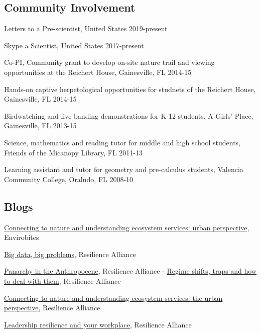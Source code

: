 \documentclass[11pt,]{article}
\providecommand{\tightlist}{%
  \setlength{\itemsep}{0pt}\setlength{\parskip}{0pt}}
\renewenvironment{itemize}{
 \begin{list}{- }{
   \setlength{\leftmargin}{1.5em}
   \setlength{\itemsep}{0pt}
 }
}{
 \end{list}
}
\begin{document}
\hypertarget{community-involvement}{%
\subsection{Community Involvement}\label{community-involvement}}

\begin{itemize}
\tightlist
\item
  Letters to a Pre-scientist, United States \hfill 2019-present
\item
  Skype a Scientist, United States \hfill 2017-present
\item
  Co-PI, Community grant to develop on-site nature trail and viewing
  opportunities at the Reichert House, Gainesville, FL \hfill 2014-15
\item
  Hands-on captive herpetological opportunities for studnets of the
  Reichert House, Gainesville, FL \hfill 2014-15
\item
  Birdwatching and live banding demonstrations for K-12 students, A
  Girls' Place, Gainesville, FL \hfill 2013-15
\item
  Science, mathematics and reading tutor for middle and high school
  students, Friends of the Micanopy Library, FL \hfill 2011-13
\item
  Learning assistant and tutor for geometry and pre-calculus students,
  Valencia Community College, Oralndo, FL \hfill 2008-10
\end{itemize}

\hypertarget{blogs}{%
\subsection{Blogs}\label{blogs}}

\begin{itemize}
\tightlist
\item
  \href{https://envirobites.org/2017/10/17/connecting-to-nature-and-understanding-ecosystem-services-the-urban-perspective/}{Connecting
  to nature and understanding ecosystem services: urban perspective},
  Envirobites
\item
  \href{http://resilience2017.org/blog/big-data-big-problems/}{Big data,
  big problems}, Resilience Alliance
\item
  \href{http://resilience2017.org/blog/panarchy-in-the-anthropocene/}{Panarchy
  in the Anthropocene}, Resilience Alliance -
  \href{http://resilience2017.org/blog/regime-shifts-traps-and-how-to-deal-with-them/}{Regime
  shifts, traps and how to deal with them}, Resilience Alliance
\item
  \href{http://resilience2017.org/blog/connecting-to-nature-and-understanding-ecosystem-services-the-urban-perspective/}{Connecting
  to nature and understanding ecosystem services: the urban
  perspective}, Resilience Alliance
\item
  \href{http://resilience2017.org/blog/leadership-resilience-and-your-workplace/}{Leadership
  resilience and your workplace}, Resilience Alliance
\end{itemize}
\end{document}
